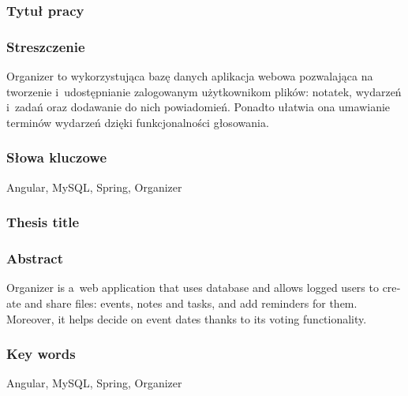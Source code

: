 \documentclass[a4paper,twoside,12pt]{book}
\begin{document}


\cleardoublepage

\rmfamily\normalfont
\pagestyle{empty}



\subsubsection*{Tytuł pracy} 
\Title

\subsubsection*{Streszczenie}  
Organizer to wykorzystująca bazę danych aplikacja webowa pozwalająca na tworzenie i~udostępnianie zalogowanym użytkownikom plików: notatek, wydarzeń i~zadań oraz dodawanie do nich powiadomień. Ponadto ułatwia ona umawianie terminów wydarzeń dzięki funkcjonalności głosowania.

\subsubsection*{Słowa kluczowe} 
Angular, MySQL, Spring, Organizer

\subsubsection*{Thesis title} 
\begin{otherlanguage}{british}
\TitleAlt
\end{otherlanguage}

\subsubsection*{Abstract} 
\begin{otherlanguage}{british}
Organizer is a~web application that uses database and allows logged users to create and share files: events, notes and tasks, and add reminders for them. Moreover, it helps decide on event dates thanks to its voting functionality.
\end{otherlanguage}
\subsubsection*{Key words}  
\begin{otherlanguage}{british}
Angular, MySQL, Spring, Organizer
\end{otherlanguage}
\end{document}

